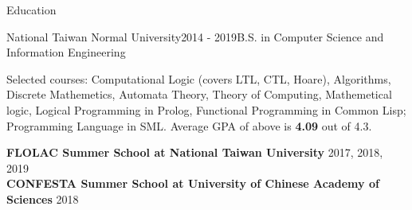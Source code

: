 \documentclass{resume} %
\begin{document}

\begin{rSection}{Education}

\begin{rSubsection}{National Taiwan Normal University}{2014 - 2019}{B.S. in Computer Science and Information Engineering}{}
\item Selected courses: Computational Logic (covers LTL, CTL, Hoare), Algorithms, Discrete Mathemetics, Automata Theory, Theory of Computing, Mathemetical logic, Logical Programming
in Prolog, Functional Programming in Common Lisp; Programming Language in SML.
Average GPA of above is {\bf 4.09} out of 4.3.
\end{rSubsection}

{\bf FLOLAC Summer School at National Taiwan University} \hfill {2017, 2018, 2019} \\
{\bf CONFESTA Summer School at University of Chinese Academy of Sciences} \hfill {2018}

\end{rSection}

\end{document}
